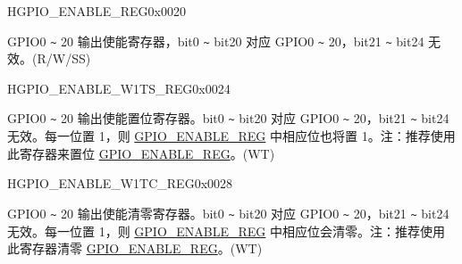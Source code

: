 \begin{register}{H}{GPIO\_ENABLE\_REG}{0x0020}\label{regdesc:GPIOENABLEREG}
%
%
\regnewline%
\begin{regdesc}\begin{reglist}
\label{fielddesc:GPIOENABLEDATA}\item [GPIO\_ENABLE\_DATA] GPIO0 \verb+~+ 20 输出使能寄存器，bit0 \verb+~+ bit20 对应 GPIO0 \verb+~+ 20，bit21 \verb+~+ bit24 无效。(R/W/SS)
\end{reglist}\end{regdesc}
\end{register}


\begin{register}{H}{GPIO\_ENABLE\_W1TS\_REG}{0x0024}\label{regdesc:GPIOENABLEW1TSREG}
%
%
\regnewline%
\begin{regdesc}\begin{reglist}
\label{fielddesc:GPIOENABLEW1TS}\item [GPIO\_ENABLE\_W1TS] GPIO0 \verb+~+ 20 输出使能置位寄存器。bit0 \verb+~+ bit20 对应 GPIO0 \verb+~+ 20，bit21 \verb+~+ bit24 无效。每一位置 1，则 \hyperref[regdesc:GPIOENABLEREG]{GPIO\_ENABLE\_REG} 中相应位也将置 1。注：推荐使用此寄存器来置位 \hyperref[regdesc:GPIOENABLEREG]{GPIO\_ENABLE\_REG}。(WT)
\end{reglist}\end{regdesc}
\end{register}


\begin{register}{H}{GPIO\_ENABLE\_W1TC\_REG}{0x0028}\label{regdesc:GPIOENABLEW1TCREG}
%
%
\regnewline%
\begin{regdesc}\begin{reglist}
\label{fielddesc:GPIOENABLEW1TC}\item [GPIO\_ENABLE\_W1TC] GPIO0 \verb+~+ 20 输出使能清零寄存器。bit0 \verb+~+ bit20 对应 GPIO0 \verb+~+ 20，bit21 \verb+~+ bit24 无效。每一位置 1，则 \hyperref[regdesc:GPIOENABLEREG]{GPIO\_ENABLE\_REG} 中相应位会清零。注：推荐使用此寄存器清零 \hyperref[regdesc:GPIOENABLEREG]{GPIO\_ENABLE\_REG}。(WT)
\end{reglist}\end{regdesc}
\end{register}


